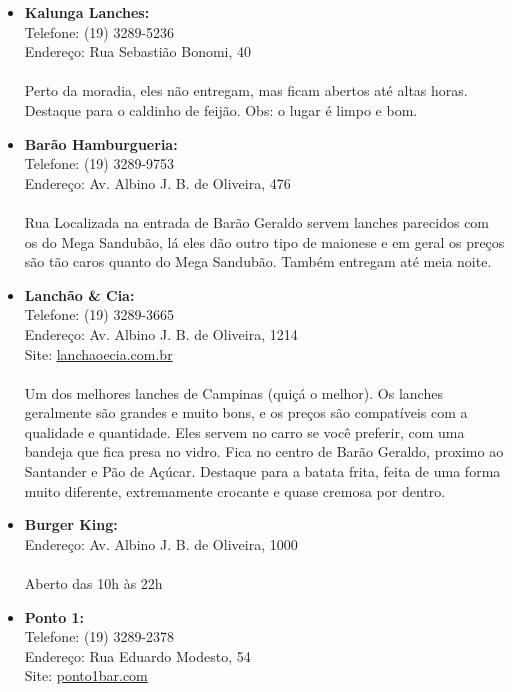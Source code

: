 \begin{itemize}
    \item   \textbf{Kalunga Lanches:}
        \\Telefone: (19) 3289-5236
        \\Endereço: Rua Sebastião Bonomi, 40
        \\\\
        Perto da moradia, eles não entregam, mas ficam abertos até altas horas.
        Destaque para o caldinho de feijão. Obs: o lugar é limpo e bom.

    \item   \textbf{Barão Hamburgueria:}
        \\Telefone: (19) 3289-9753
        \\Endereço: Av. Albino J. B. de Oliveira, 476
        \\\\
        Rua Localizada na entrada de Barão Geraldo servem lanches parecidos com
        os do Mega Sandubão, lá eles dão outro tipo de maionese e em geral os
        preços são tão caros quanto do Mega Sandubão. Também entregam até meia
        noite.

    \item   \textbf{Lanchão \& Cia:}
        \\Telefone: (19) 3289-3665
        \\Endereço: Av. Albino J. B. de Oliveira, 1214
        \\Site: \url{lanchaoecia.com.br}
        \\\\
        Um dos melhores lanches de Campinas (quiçá o melhor). Os lanches
        geralmente são grandes e muito bons, e os preços são compatíveis com a
        qualidade e quantidade. Eles servem no carro se você preferir, com uma
        bandeja que fica presa no vidro. Fica no centro de Barão Geraldo,
        proximo ao Santander e Pão de Açúcar. Destaque para a batata frita,
        feita de uma forma muito diferente, extremamente crocante e quase
        cremosa por dentro.

    \item   \textbf{Burger King:}
        \\Endereço: Av. Albino J. B. de Oliveira, 1000
        \\\\
        Aberto das 10h às 22h

    \item   \textbf{Ponto 1:}
        \\Telefone: (19) 3289-2378
        \\Endereço: Rua Eduardo Modesto, 54
        \\Site: \url{ponto1bar.com}


\end{itemize}
